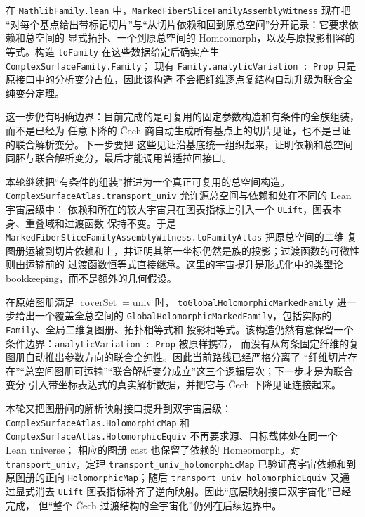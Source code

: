 \documentclass[UTF8,fontset=none,a4paper,11pt]{ctexart}
\begin{document}
\newpage
在 \texttt{MathlibFamily.lean} 中，\texttt{MarkedFiberSliceFamilyAssemblyWitness} 现在把
“对每个基点给出带标记切片”与“从切片依赖和回到原总空间”分开记录：它要求依赖和总空间的
显式拓扑、一个到原总空间的 Homeomorph，以及与原投影相容的等式。构造
\texttt{toFamily} 在这些数据给定后确实产生 \texttt{ComplexSurfaceFamily.Family}；
现有 \texttt{Family.analyticVariation : Prop} 只是原接口中的分析变分占位，因此该构造
不会把纤维逐点复结构自动升级为联合全纯变分定理。

这一步仍有明确边界：目前完成的是可复用的固定参数构造和有条件的全族组装，而不是已经为
任意下降的 Čech 商自动生成所有基点上的切片见证，也不是已证的联合解析变分。下一步要把
这些见证沿基底统一组织起来，证明依赖和总空间同胚与联合解析变分，最后才能调用普适拉回接口。

本轮继续把“有条件的组装”推进为一个真正可复用的总空间构造。
\texttt{ComplexSurfaceAtlas.}\allowbreak\texttt{transport\_univ} 允许源总空间与依赖和处在不同的 Lean 宇宙层级中：
依赖和所在的较大宇宙只在图表指标上引入一个 \texttt{ULift}，图表本身、重叠域和过渡函数
保持不变。于是 \texttt{MarkedFiberSliceFamilyAssemblyWitness.}\allowbreak\texttt{toFamilyAtlas} 把原总空间的二维
复图册运输到切片依赖和上，并证明其第一坐标仍然是族的投影；过渡函数的可微性则由运输前的
过渡函数恒等式直接继承。这里的宇宙提升是形式化中的类型论 bookkeeping，而不是额外的几何假设。

在原始图册满足 \(\operatorname{coverSet}=\mathrm{univ}\) 时，
\texttt{toGlobalHolomorphicMarkedFamily} 进一步给出一个覆盖全总空间的
\texttt{GlobalHolomorphicMarkedFamily}，包括实际的 \texttt{Family}、全局二维复图册、拓扑相等式和
投影相等式。该构造仍然有意保留一个条件边界：\texttt{analyticVariation : Prop} 被原样携带，
而没有从每条固定纤维的复图册自动推出参数方向的联合全纯性。因此当前路线已经严格分离了
“纤维切片存在”“总空间图册可运输”“联合解析变分成立”这三个逻辑层次；下一步才是为联合变分
引入带坐标表达式的真实解析数据，并把它与 Čech 下降见证连接起来。

\begin{sloppypar}
本轮又把图册间的解析映射接口提升到双宇宙层级：
\texttt{ComplexSurfaceAtlas.}\allowbreak\texttt{HolomorphicMap} 和
\texttt{ComplexSurfaceAtlas.HolomorphicEquiv} 不再要求源、目标载体处在同一个 Lean universe；
相应的图册 cast 也保留了依赖的 Homeomorph。对 \texttt{transport\_univ}，定理
\texttt{transport\_univ\_holomorphicMap} 已验证高宇宙依赖和到原图册的正向
\texttt{HolomorphicMap}；随后 \texttt{transport\_univ\_holomorphicEquiv} 又通过显式消去
\texttt{ULift} 图表指标补齐了逆向映射。因此“底层映射接口双宇宙化”已经完成，
但“整个 Čech 过渡结构的全宇宙化”仍列在后续边界中。
\end{sloppypar}
\end{document}
